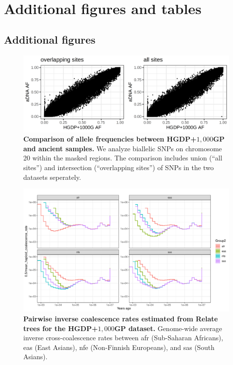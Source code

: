 \chapter{\label{app:2}Additional figures and tables}

\minitoc

\section{Additional figures}
\label{sec:additional_figures}

\begin{figure}
    \centering
    \includegraphics[width=\textwidth]{figures/gb_merge_sanity_check.png}
    \caption{\textbf{Comparison of allele frequencies between HGDP+$1{,}000$GP and ancient samples.} We analyze biallelic SNPs on chromosome 20 within the masked regions. The comparison includes union (``all sites'') and intersection (``overlapping sites'') of SNPs in the two datasets seperately.}
    \label{fig:gb-sanity-check}
\end{figure}


\begin{figure}
    \centering
    \includegraphics[width=\textwidth]{figures/gb_pairwise_coal/gb_pairwise_coal_hgdp_1gp.pdf}
    \caption{\textbf{Pairwise inverse coalescence rates estimated from Relate trees for the HGDP+$1{,}000$GP dataset.} Genome-wide average inverse cross-coalescence rates between afr (Sub-Saharan Africans), eas (East Asians), nfe (Non-Finnish Europeans), and sas (South Asians).}
    \label{fig:gb_pairwise_coal_hgdp_1gp}
\end{figure}

